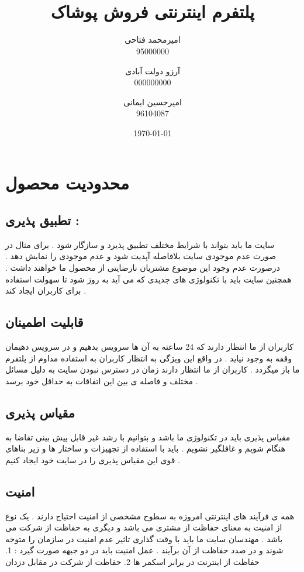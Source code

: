 \documentclass[12pt,onecolumn,a4paper]{article}
\begin{document}
\title{ \\ پلتفرم اینترنتی فروش پوشاک}
\author{امیرمحمد فتاحی\\95000000 \and آرزو دولت آبادی \\000000000 \and امیرحسین ایمانی\\96104087}
\date{\today}
\maketitle

\newpage
\tableofcontents
\newpage
\listoffigures
\newpage


\section{محدودیت محصول}
\subsection{تطبیق پذیری :}

سایت ما باید بتواند با شرایط مختلف تطبیق پذیرد و سازگار شود . برای مثال در صورت عدم موجودی سایت بلافاصله آپدیت شود و عدم موجودی را نمایش دهد . درصورت عدم وجود این موضوع مشتریان نارضایتی از محصول ما خواهند داشت . همچنین سایت باید با تکنولوژی های جدیدی که می آید به روز شود تا سهولت استفاده برای کاربران ایجاد کند .
\subsection{قابلیت اطمینان }
کاربران از ما انتظار دارند که 24 ساعته به آن ها سرویس بدهیم و در سرویس دهیمان وقفه به وجود نیاید . در واقع این ویژگی به انتظار کاربران به استفاده مداوم از پلتفرم ما باز میگردد . کاربران از ما انتظار دارند زمان در دسترس نبودن سایت به دلیل مسائل مختلف و فاصله ی بین این اتفاقات به حداقل خود برسد .

\subsection{مقیاس پذیری }
مقیاس پذیری باید در تکنولوژی ما باشد و بتوانیم با رشد غیر قابل پیش بینی تقاضا به هنگام شویم و غافلگیر نشویم . باید با استفاده از تجهیزات و ساختار ها و زیر بناهای قوی این مقیاس پذیری را در سایت خود ایجاد کنیم .

\subsection{امنیت}
همه ی فرآیند های اینترنتی امروزه به سطوح مشخصی از امنیت احتیاج دارند . یک نوع از امنیت به معنای حفاظت از مشتری می باشد و دیگری به حفاظت از شرکت می باشد . مهندسان سایت ما باید با وقت گذاری تاثیر عدم امنیت در سازمان را متوجه شوند و در صدد حفاظت از آن برآیند .  عمل امنیت باید در دو جبهه صورت گیرد : 1. حفاظت از اینترنت در برابر اسکمر ها 2. حفاظت از شرکت در مقابل دزدان
\end{document}

